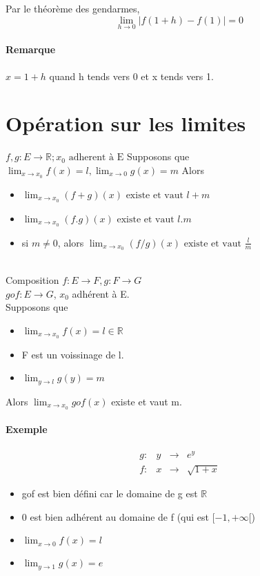 Par le théorème des gendarmes, \[\lim_{h \to 0} |f(1+h)-f(1)| =0\]

\paragraph{Remarque} $x = 1+h$ quand h tends vers 0 et x tends vers 1.

\section{Opération sur les limites}

$f, g : E \rightarrow \mathbb{R}; x_0 \text{ adherent à E}$
Supposons que $\lim_{x \to x_0} f(x) = l, \lim_{x \to 0} g(x) = m$ Alors 
\begin{itemize}
	\item $\lim_{x \to x_0} (f+g)(x) \text{ existe et vaut } l+m$
	\item $\lim_{x \to x_0} (f.g)(x) \text{ existe et vaut } l.m $
	\item si $m \neq 0$, alors $\lim_{x \to x_0} (f/g)(x) \text{ existe et vaut } \frac{l}{m}$
\end{itemize}

~\\
Composition $f:E \rightarrow F, g:F \rightarrow G$
~\\
$gof : E \rightarrow G$, $x_0$ adhérent à E.
~\\

Supposons que \begin{itemize}
	\item $\lim_{x \to x_0} f(x) = l \in \mathbb{R}$
	\item F est un voissinage de l.
	\item $\lim_{y \to l} g(y) = m$
\end{itemize}

Alors $\lim_{x \to x_0} gof(x)$ existe et vaut m.

\paragraph{Exemple} \[\begin{array}{rccl}
	g:& y&\rightarrow & e^y \\
		f:& x&\rightarrow & \sqrt{1+x}
\end{array}\]

\begin{itemize}
	\item gof est bien défini car le domaine de g est $\mathbb{R}$
	\item 0 est bien adhérent  au domaine de f (qui est $[-1, +\infty[$)
	\item $\lim_{x \to 0} f(x) = l$
	\item $\lim_{y \to 1} g(x) = e$
\end{itemize}

